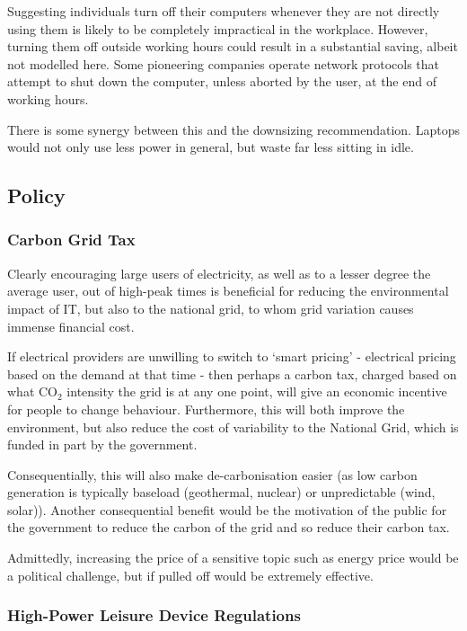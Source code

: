 \documentclass[conference]{IEEEtran}
\begin{document}
Suggesting individuals turn off their computers whenever they are not
directly using them is likely to be completely impractical in the
workplace. However, turning them off outside working hours could
result in a substantial saving, albeit not modelled here. Some
pioneering companies operate network protocols that attempt to shut
down the computer, unless aborted by the user, at the end of working
hours.

There is some synergy between this and the downsizing
recommendation. Laptops would not only use less power in general, but
waste far less sitting in idle.

\subsection{Policy}

\subsubsection{Carbon Grid Tax}

Clearly encouraging large users of electricity, as well as to a lesser
degree the average user, out of high-peak times is beneficial for
reducing the environmental impact of IT, but also to the national
grid, to whom grid variation causes immense financial cost.

If electrical providers are unwilling to switch to `smart pricing' -
electrical pricing based on the demand at that time - then perhaps a
carbon tax, charged based on what CO$_2$ intensity the grid is at any one
point, will give an economic incentive for people to change
behaviour. Furthermore, this will both improve the environment, but
also reduce the cost of variability to the National Grid, which is
funded in part by the government.

Consequentially, this will also make de-carbonisation easier (as low
carbon generation is typically baseload (geothermal, nuclear) or
unpredictable (wind, solar)). Another consequential benefit would be
the motivation of the public for the government to reduce the carbon
of the grid and so reduce their carbon tax.

Admittedly, increasing the price of a sensitive topic such as energy
price would be a political challenge, but if pulled off would be
extremely effective.

\subsubsection{High-Power Leisure Device Regulations}
\end{document}
